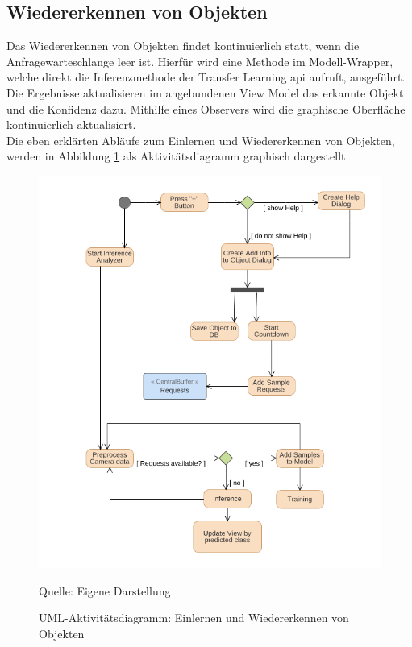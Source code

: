 \documentclass[oneside]{ausarbeitung}
\begin{document}
\subsection{Wiedererkennen von Objekten}
Das Wiedererkennen von Objekten findet kontinuierlich statt, wenn die Anfragewarteschlange leer ist. Hierfür wird eine Methode im Modell-Wrapper, welche direkt die Inferenzmethode der Transfer Learning \ac{api} aufruft, ausgeführt. Die Ergebnisse aktualisieren im angebundenen View Model das erkannte Objekt und die Konfidenz dazu. Mithilfe eines Observers wird die graphische Oberfläche kontinuierlich aktualisiert.\\
Die eben erklärten Abläufe zum Einlernen und Wiedererkennen von Objekten, werden in Abbildung \ref{fig:activity-diagram-model} als Aktivitätsdiagramm graphisch dargestellt.
\begin{figure}[hptb]
	\centering
	\includegraphics[height=0.6\textheight]{images/addobject-diagram.png}	\caption{UML-Aktivitätsdiagramm: Einlernen und Wiedererkennen von Objekten} Quelle: Eigene Darstellung
	\label{fig:activity-diagram-model}
\end{figure}
\end{document}
